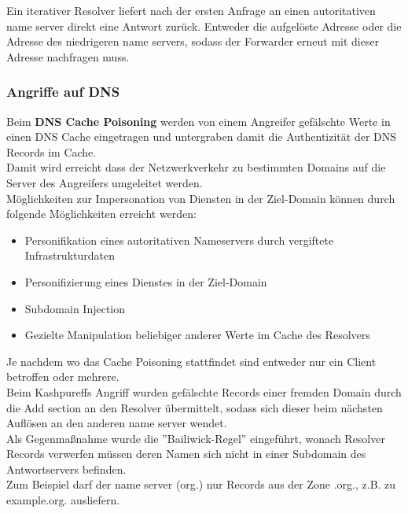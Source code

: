 \documentclass[a4paper,12pt,leqno]{article}
\begin{document}
Ein iterativer Resolver liefert nach der ersten Anfrage an einen autoritativen name server direkt eine Antwort zurück. Entweder die aufgelöste Adresse oder die Adresse des niedrigeren name servers, sodass der Forwarder erneut mit dieser Adresse nachfragen muss. 

\subsubsection{Angriffe auf DNS}

Beim \textbf{DNS Cache Poisoning} werden von einem Angreifer gefälschte Werte in einen DNS Cache eingetragen und untergraben damit die Authentizität der DNS Records im Cache.\\
Damit wird erreicht dass der Netzwerkverkehr zu bestimmten Domains auf die Server des Angreifers umgeleitet werden.\\

Möglichkeiten zur Impersonation von Diensten in der Ziel-Domain können durch folgende Möglichkeiten erreicht werden:
\begin{itemize}
\item Personifikation eines autoritativen Nameservers durch vergiftete Infrastrukturdaten
\item Personifizierung eines Dienstes in der Ziel-Domain
\item Subdomain Injection
\item Gezielte Manipulation beliebiger anderer Werte im Cache des Resolvers
\end{itemize}

Je nachdem wo das Cache Poisoning stattfindet sind entweder nur ein Client betroffen oder mehrere.\\

Beim Kashpureffs Angriff wurden gefälschte Records einer fremden Domain durch die Add section an den Resolver übermittelt, sodass sich dieser beim nächsten Auflösen an den anderen name server wendet.\\
Als Gegenmaßnahme wurde die ''Bailiwick-Regel'' eingeführt, wonach Resolver Records verwerfen müssen deren Namen sich nicht in einer Subdomain des Antwortservers befinden.\\
Zum Beispiel darf der name server (org.) nur Records aus der Zone .org., z.B. zu example.org. ausliefern.\\
\end{document}

